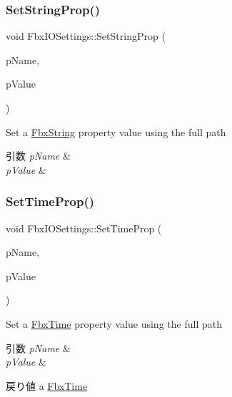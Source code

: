 \subsubsection{\texorpdfstring{Set\+String\+Prop()}{SetStringProp()}}
{\footnotesize\ttfamily void Fbx\+I\+O\+Settings\+::\+Set\+String\+Prop (\begin{DoxyParamCaption}\item[{const char $\ast$}]{p\+Name,  }\item[{\hyperlink{class_fbx_string}{Fbx\+String}}]{p\+Value }\end{DoxyParamCaption})}

Set a \hyperlink{class_fbx_string}{Fbx\+String} property value using the full path 
\begin{DoxyParams}{引数}
{\em p\+Name} & \\
\hline
{\em p\+Value} & \\
\hline
\end{DoxyParams}
\mbox{\label{class_fbx_i_o_settings_a780a8567ad7916be8914e9a22c09f1a5}} 
\subsubsection{\texorpdfstring{Set\+Time\+Prop()}{SetTimeProp()}}
{\footnotesize\ttfamily void Fbx\+I\+O\+Settings\+::\+Set\+Time\+Prop (\begin{DoxyParamCaption}\item[{const char $\ast$}]{p\+Name,  }\item[{\hyperlink{class_fbx_time}{Fbx\+Time}}]{p\+Value }\end{DoxyParamCaption})}

Set a \hyperlink{class_fbx_time}{Fbx\+Time} property value using the full path 
\begin{DoxyParams}{引数}
{\em p\+Name} & \\
\hline
{\em p\+Value} & \\
\hline
\end{DoxyParams}
\begin{DoxyReturn}{戻り値}
a \hyperlink{class_fbx_time}{Fbx\+Time} 
\end{DoxyReturn}
\mbox{\label{class_fbx_i_o_settings_a5b8c0000832b00d77e469cfb1b8f4c81}} 
